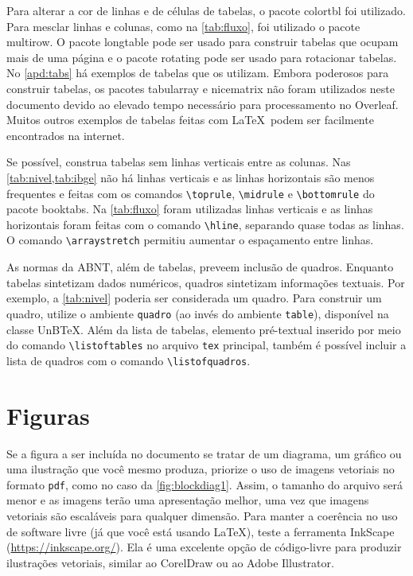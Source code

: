 Para alterar a cor de linhas e de células de tabelas, o pacote \textsf{colortbl} foi utilizado. Para mesclar linhas e colunas, como na \cref{tab:fluxo}, foi utilizado o pacote \textsf{multirow}. O pacote \textsf{longtable} pode ser usado para construir tabelas que ocupam mais de uma página e o pacote \textsf{rotating} pode ser usado para rotacionar tabelas. No \cref{apd:tabs} há exemplos de tabelas que os utilizam. Embora poderosos para construir tabelas, os pacotes \textsf{tabularray} e \textsf{nicematrix} não foram utilizados neste documento devido ao elevado tempo necessário para processamento no Overleaf. Muitos outros exemplos de tabelas feitas com \LaTeX\ podem ser facilmente encontrados na internet.

Se possível, construa tabelas sem linhas verticais entre as colunas. Nas \cref{tab:nivel,tab:ibge} não há linhas verticais e as linhas horizontais são menos frequentes e feitas com os comandos \verb|\toprule|, \verb|\midrule| e \verb|\bottomrule| do pacote \textsf{booktabs}. Na \cref{tab:fluxo} foram utilizadas linhas verticais e as linhas horizontais foram feitas com o comando \verb|\hline|, separando quase todas as linhas. O comando \verb|\arraystretch| permitiu aumentar o espaçamento entre linhas.

As normas da ABNT, além de tabelas, preveem inclusão de quadros. Enquanto tabelas sintetizam dados numéricos, quadros sintetizam informações textuais. Por exemplo, a \cref{tab:nivel} poderia ser considerada um quadro. Para construir um quadro, utilize o ambiente \texttt{quadro} (ao invés do ambiente \texttt{table}), disponível na classe UnB\TeX. Além da lista de tabelas, elemento pré-textual inserido por meio do comando \verb|\listoftables| no arquivo \texttt{tex} principal, também é possível incluir a lista de quadros com o comando \verb|\listofquadros|.

\section{Figuras}

Se a figura a ser incluída no documento se tratar de um diagrama, um gráfico ou uma ilustração que você mesmo produza, priorize o uso de imagens vetoriais no formato \texttt{pdf}, como no caso da \cref{fig:blockdiag1}. Assim, o tamanho do arquivo será menor e as imagens terão uma apresentação melhor, uma vez que imagens vetoriais são escaláveis para qualquer dimensão. Para manter a coerência no uso de software livre (já que você está usando \LaTeX), teste a ferramenta \textsf{InkScape} (\url{https://inkscape.org/}). Ela é uma excelente opção de código-livre para produzir ilustrações vetoriais, similar ao CorelDraw ou ao Adobe Illustrator.

